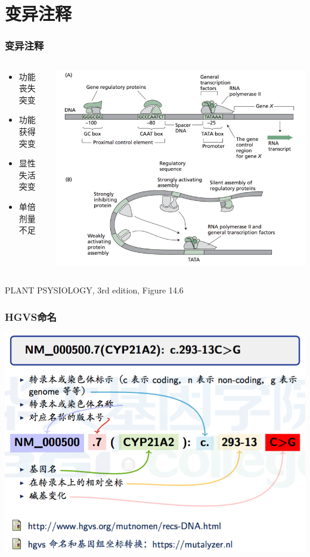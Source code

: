 \documentclass[12pt]{beamer}
\begin{document}
\section{变异注释}
\begin{frame}\frametitle{变异注释}
  \begin{columns}
    \begin{column}{0.35\textwidth}
\begin{itemize}
  \item 功能丧失突变
  \item 功能获得突变
  \item 显性失活突变
  \item 单倍剂量不足
\end{itemize}
    \end{column}
    \begin{column}{0.7\textwidth}
      \includegraphics[width=\textwidth]{figures/func.png}  
    \end{column}
  \end{columns}
  PLANT PSYSIOLOGY, 3rd edition, Figure 14.6
\end{frame}
\begin{frame}\frametitle{HGVS命名}
    \includegraphics[width=\textwidth]{figures/old_slides/hgvs.png}  
\end{frame}
\end{document}
